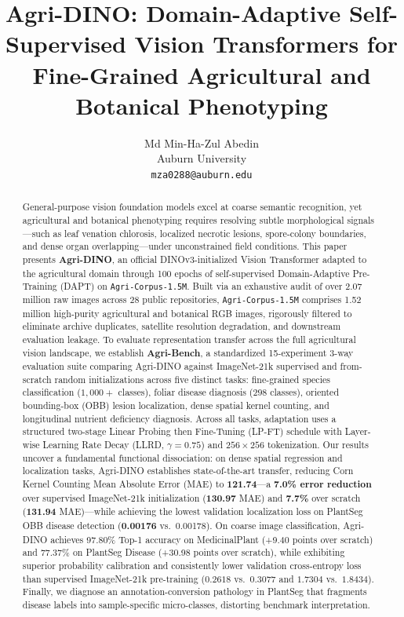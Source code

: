 \documentclass[10pt,twocolumn,letterpaper]{article}
\title{Agri-DINO: Domain-Adaptive Self-Supervised Vision Transformers for Fine-Grained Agricultural and Botanical Phenotyping}
\author{
Md Min-Ha-Zul Abedin\\
Auburn University\\
{\tt\small mza0288@auburn.edu}
}
\begin{document}
\maketitle

\begin{abstract}
General-purpose vision foundation models excel at coarse semantic recognition, yet agricultural and botanical phenotyping requires resolving subtle morphological signals—such as leaf venation chlorosis, localized necrotic lesions, spore-colony boundaries, and dense organ overlapping—under unconstrained field conditions. This paper presents \textbf{Agri-DINO}, an official DINOv3-initialized Vision Transformer adapted to the agricultural domain through 100 epochs of self-supervised Domain-Adaptive Pre-Training (DAPT) on \texttt{Agri-Corpus-1.5M}. Built via an exhaustive audit of over 2.07 million raw images across 28 public repositories, \texttt{Agri-Corpus-1.5M} comprises \num{1.52} million high-purity agricultural and botanical RGB images, rigorously filtered to eliminate archive duplicates, satellite resolution degradation, and downstream evaluation leakage. To evaluate representation transfer across the full agricultural vision landscape, we establish \textbf{Agri-Bench}, a standardized 15-experiment 3-way evaluation suite comparing Agri-DINO against ImageNet-21k supervised and from-scratch random initializations across five distinct tasks: fine-grained species classification ($1,000+$ classes), foliar disease diagnosis ($298$ classes), oriented bounding-box (OBB) lesion localization, dense spatial kernel counting, and longitudinal nutrient deficiency diagnosis. Across all tasks, adaptation uses a structured two-stage Linear Probing then Fine-Tuning (LP-FT) schedule with Layer-wise Learning Rate Decay (LLRD, $\gamma{=}0.75$) and $256\times256$ tokenization. Our results uncover a fundamental functional dissociation: on dense spatial regression and localization tasks, Agri-DINO establishes state-of-the-art transfer, reducing Corn Kernel Counting Mean Absolute Error (MAE) to \textbf{121.74}—a \textbf{7.0\% error reduction} over supervised ImageNet-21k initialization (\textbf{130.97} MAE) and \textbf{7.7\%} over scratch (\textbf{131.94} MAE)—while achieving the lowest validation localization loss on PlantSeg OBB disease detection (\textbf{0.00176} vs.\ 0.00178). On coarse image classification, Agri-DINO achieves 97.80\% Top-1 accuracy on MedicinalPlant (+9.40 points over scratch) and 77.37\% on PlantSeg Disease (+30.98 points over scratch), while exhibiting superior probability calibration and consistently lower validation cross-entropy loss than supervised ImageNet-21k pre-training ($0.2618$ vs.\ $0.3077$ and $1.7304$ vs.\ $1.8434$). Finally, we diagnose an annotation-conversion pathology in PlantSeg that fragments disease labels into sample-specific micro-classes, distorting benchmark interpretation.
\end{abstract}
\end{document}
